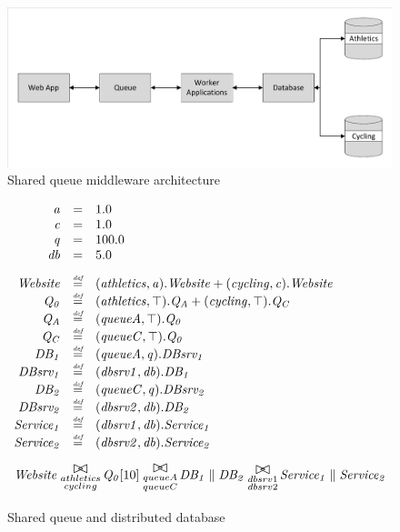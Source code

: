 \begin{figure}
	\caption{Shared queue middleware architecture}
	\centering
	\includegraphics[trim = 5 5 5 5, clip, width=\textwidth]{img/sharedqueue}
\end{figure}

\begin{figure}
	\caption{Shared queue and distributed database}
	\label{figure:queuedd}
	\centering
	\begin{displaymath}
	\begin{array}{rcl}
	\mathit{a} & = & 1.0\\
	\mathit{c} & = & 1.0\\
	\mathit{q} & = & 100.0\\
	\mathit{db} & = & 5.0\\
	[2.0ex]		\mathit{Website} & \rmdef & (\mathit{athletics},\mathit{a}).\mathit{Website}+(\mathit{cycling},\mathit{c}).\mathit{Website}\\
	\mathit{Q_0} & \rmdef & (\mathit{athletics},\top).\mathit{Q_A}+(\mathit{cycling},\top).\mathit{Q_C}\\
	\mathit{Q_A} & \rmdef & (\mathit{queueA},\top).\mathit{Q_0}\\
	\mathit{Q_C} & \rmdef & (\mathit{queueC},\top).\mathit{Q_0}\\
	\mathit{DB_1} & \rmdef & (\mathit{queueA},\mathit{q}).\mathit{DBsrv_1}\\
	\mathit{DBsrv_1} & \rmdef & (\mathit{dbsrv1},\mathit{db}).\mathit{DB_1}\\
	\mathit{DB_2} & \rmdef & (\mathit{queueC},\mathit{q}).\mathit{DBsrv_2}\\
	\mathit{DBsrv_2} & \rmdef & (\mathit{dbsrv2},\mathit{db}).\mathit{DB_2}\\
	\mathit{Service_1} & \rmdef & (\mathit{dbsrv1},\mathit{db}).\mathit{Service_1}\\
	\mathit{Service_2} & \rmdef & (\mathit{dbsrv2},\mathit{db}).\mathit{Service_2}\\
	[2.0ex]		\multicolumn{3}{l}{\mathit{Website}\sync{\substack{athletics\\cycling}}\mathit{Q_0}[10]\sync{\substack{queueA\\queueC}}\mathit{DB_1}\parallel\mathit{DB_2}\sync{\substack{dbsrv1\\dbsrv2}}\mathit{Service_1}\parallel\mathit{Service_2}}\\
	[2.0ex]	\end{array}
	\end{displaymath}
\end{figure}


